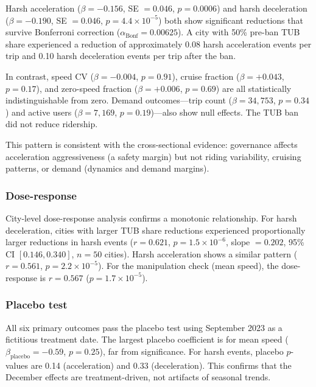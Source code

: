 Harsh acceleration ($\beta = -0.156$, SE $= 0.046$, $p = 0.0006$) and harsh deceleration ($\beta = -0.190$, SE $= 0.046$, $p = 4.4 \times 10^{-5}$) both show significant reductions that survive Bonferroni correction ($\alpha_{\text{Bonf}} = 0.00625$). A city with 50\% pre-ban TUB share experienced a reduction of approximately 0.08 harsh acceleration events per trip and 0.10 harsh deceleration events per trip after the ban.

In contrast, speed CV ($\beta = -0.004$, $p = 0.91$), cruise fraction ($\beta = +0.043$, $p = 0.17$), and zero-speed fraction ($\beta = +0.006$, $p = 0.69$) are all statistically indistinguishable from zero. Demand outcomes---trip count ($\beta = 34{,}753$, $p = 0.34$) and active users ($\beta = 7{,}169$, $p = 0.19$)---also show null effects. The TUB ban did not reduce ridership.

This pattern is consistent with the cross-sectional evidence: governance affects acceleration aggressiveness (a safety margin) but not riding variability, cruising patterns, or demand (dynamics and demand margins).

\subsubsection{Dose-response}

City-level dose-response analysis confirms a monotonic relationship. For harsh deceleration, cities with larger TUB share reductions experienced proportionally larger reductions in harsh events ($r = 0.621$, $p = 1.5 \times 10^{-6}$, slope $= 0.202$, 95\% CI $[0.146, 0.340]$, $n = 50$ cities). Harsh acceleration shows a similar pattern ($r = 0.561$, $p = 2.2 \times 10^{-5}$). For the manipulation check (mean speed), the dose-response is $r = 0.567$ ($p = 1.7 \times 10^{-5}$).

\subsubsection{Placebo test}

All six primary outcomes pass the placebo test using September 2023 as a fictitious treatment date. The largest placebo coefficient is for mean speed ($\beta_{\text{placebo}} = -0.59$, $p = 0.25$), far from significance. For harsh events, placebo $p$-values are 0.14 (acceleration) and 0.33 (deceleration). This confirms that the December effects are treatment-driven, not artifacts of seasonal trends.

